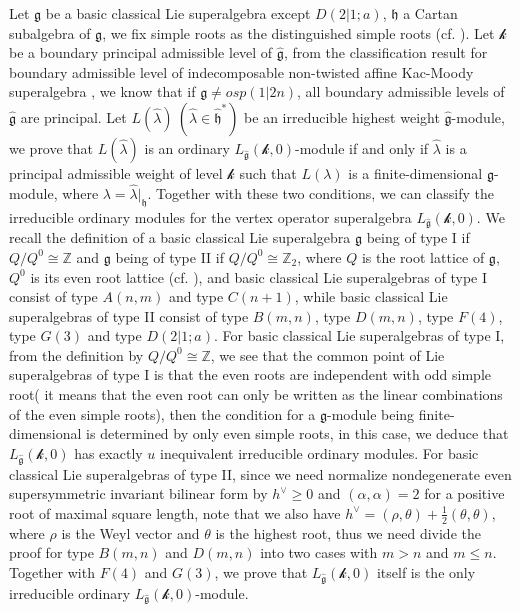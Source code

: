 \documentclass[12pt]{article}
\begin{document}
Let $\mathfrak{g}$ be a basic classical Lie superalgebra except $D(2|1;a)$, $\mathfrak{h}$ a Cartan subalgebra of $\mathfrak{g}$,
we fix simple roots as the distinguished simple roots (cf. \cite{Mu12}).
Let $\mathcal{k}$ be a boundary principal admissible level of $\widehat{\mathfrak{g}}$,
from the classification result for boundary admissible level of indecomposable non-twisted affine Kac-Moody superalgebra \cite{GK25},
we know that if $\mathfrak{g}\ne osp(1|2n)$, all boundary admissible levels of $\widehat{\mathfrak{g}}$ are principal.
Let $L(\hat{\lambda})~(\hat{\lambda}\in \widehat{\mathfrak{h}}^*)$ be an irreducible highest weight $\widehat{\mathfrak{g}}$-module,
we prove that $L(\hat{\lambda})$ is an ordinary $L_{\widehat{\mathfrak{g}}}(\mathcal{k},0)$-module if and only if
$\hat{\lambda}$ is a principal admissible weight of level $\mathcal{k}$ such that $L(\lambda)$
is a finite-dimensional $\mathfrak{g}$-module, where $\lambda=\hat{\lambda}|_{\mathfrak{h}}$.
Together with these two conditions,
we can classify the irreducible ordinary modules for the vertex operator superalgebra $L_{\widehat{\mathfrak{g}}}(\mathcal{k},0)$.
We recall the definition of a basic classical Lie superalgebra $\mathfrak{g}$ being of type I if $Q/Q^0\cong\mathbb{Z}$
and $\mathfrak{g}$ being of type II if $Q/Q^0\cong\mathbb{Z}_2$, where $Q$ is the root lattice of $\mathfrak{g}$, $Q^0$ is its even root lattice (cf. \cite{Kac77,S11}),
and basic classical Lie superalgebras of type I consist of type $A(n,m)$ and type $C(n+1)$, while
basic classical Lie superalgebras of type II consist of type $B(m,n)$, type $D(m,n)$, type $F(4)$, type $G(3)$ and type $D(2|1;a)$.
For basic classical Lie superalgebras of type I,
from the definition by $Q/Q^0\cong\mathbb{Z}$, we see that the common point of Lie superalgebras of type I
is that the even roots are independent with odd simple root( it means that the even root can only be written as the linear combinations of the even simple roots), then the condition for a $\mathfrak{g}$-module being finite-dimensional is determined by only even simple roots, in this case,
we deduce that $L_{\widehat{\mathfrak{g}}}(\mathcal{k},0)$ has exactly $u$ inequivalent irreducible ordinary modules.
For basic classical Lie superalgebras of type II,
since we need normalize nondegenerate even supersymmetric invariant bilinear form by $h^\vee\geq0$ and $(\alpha,\alpha)=2$ for a positive root of maximal square length,
note that we also have $h^\vee=(\rho,\theta)+\frac{1}{2}(\theta,\theta)$, where $\rho$ is the Weyl vector and $\theta$ is the highest root,
thus we need divide the proof for type $B(m,n)$ and $D(m,n)$
into two cases with $m>n$ and $m\leq n$.
Together with $F(4)$ and $G(3)$,
we prove that $L_{\widehat{\mathfrak{g}}}(\mathcal{k},0)$ itself is the only irreducible ordinary $L_{\widehat{\mathfrak{g}}}(\mathcal{k},0)$-module.
\end{document}

